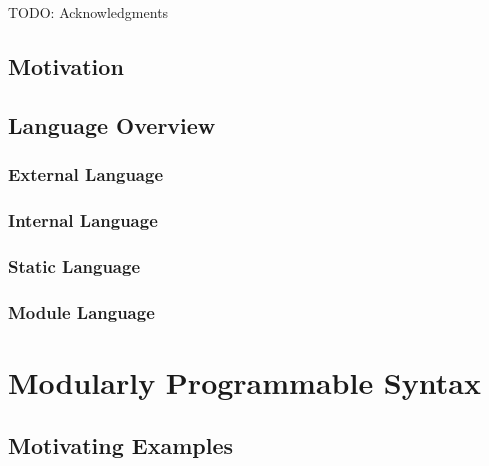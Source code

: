 \documentclass[12pt]{cmuthesis}
\newcommand{\todo}[1]{{\color{red} TODO: #1}}
\begin{document}
\begin{acknowledgments}
\todo{Acknowledgments}
\end{acknowledgments}


\tableofcontents
\listoffigures

\mainmatter


%
%
%
%
%


\chapter{Motivation}

\chapter{Language Overview}
\section{External Language}
\section{Internal Language}
\section{Static Language}
\section{Module Language}


\part{Modularly Programmable Syntax}
\chapter{Motivating Examples}
\end{document}
